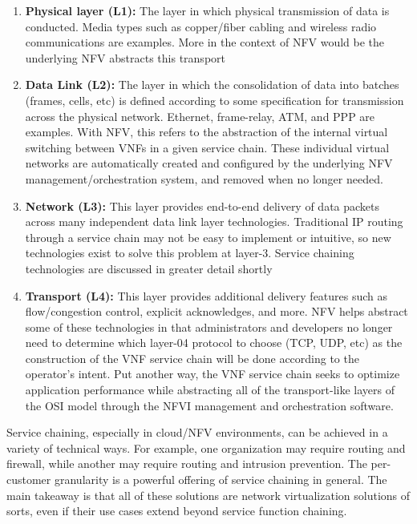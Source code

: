 \begin{enumerate}
  \item \textbf{Physical layer (L1):} The layer in which physical transmission of
  data is conducted. Media types such as copper/fiber cabling and wireless radio
  communications are examples. More in the context of NFV would be the
  underlying NFV abstracts this transport
  \item \textbf{Data Link (L2):} The layer in which the consolidation of data
  into batches (frames, cells, etc) is defined according to some specification for
  transmission across the physical network. Ethernet, frame-relay, ATM, and PPP
  are examples. With NFV, this refers to the abstraction of the internal virtual
  switching between VNFs in a given service chain. These individual virtual
  networks are automatically created and configured by the underlying NFV
  management/orchestration system, and removed when no longer needed.
  \item \textbf{Network (L3):} This layer provides end-to-end delivery of data
  packets across many independent data link layer technologies. Traditional IP
  routing through a service chain may not be easy to implement or intuitive, so
  new technologies exist to solve this problem at layer-3. Service chaining
  technologies are discussed in greater detail shortly
  \item \textbf{Transport (L4):} This layer provides additional delivery features
  such as flow/congestion control, explicit acknowledges, and more. NFV helps
  abstract some of these technologies in that administrators and developers no
  longer need to determine which layer-04 protocol to choose (TCP, UDP, etc) as
  the construction of the VNF service chain will be done according to the
  operator's intent. Put another way, the VNF service chain seeks to optimize
  application performance while abstracting all of the transport-like layers of
  the OSI model through the NFVI management and orchestration software.
\end{enumerate}

Service chaining, especially in cloud/NFV environments, can be achieved in a
variety of technical ways. For example, one organization may require routing
and firewall, while another may require routing and intrusion prevention. The
per-customer granularity is a powerful offering of service chaining in
general. The main takeaway is that all of these solutions are network
virtualization solutions of sorts, even if their use cases extend beyond
service function chaining.

